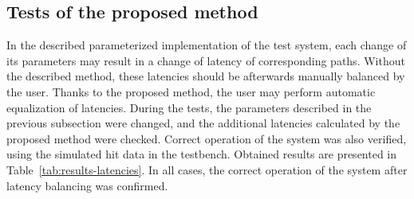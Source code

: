 \documentclass[preprint,11pt]{elsarticle}
\begin{document}
\subsection{Tests of the proposed method}
In the described parameterized implementation of the test system, each change of its parameters
may result in a change of latency of corresponding paths.
Without the described method, these latencies should be afterwards manually balanced by the user.
Thanks to the proposed method, the user may perform automatic equalization of latencies.
During the tests, the parameters described in the previous subsection were changed, and the
additional latencies calculated by the proposed method were checked.
Correct operation of the system was also verified, using the simulated hit data in the testbench.
Obtained results are presented in Table~\ref{tab:results-latencies}.
In all cases,  the correct operation of the system after latency balancing was confirmed.
\end{document}
